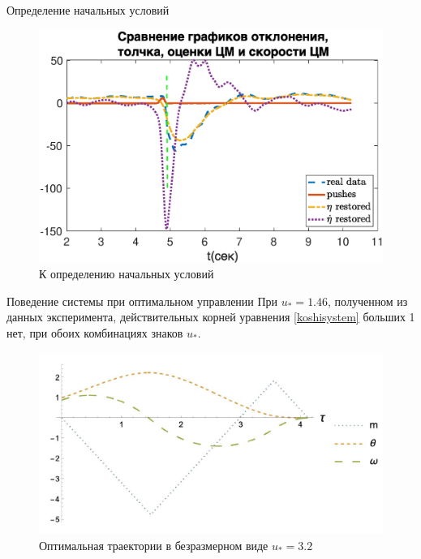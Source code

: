 \documentclass[10pt]{beamer}
\begin{document}
\begin{frame}{Определение начальных условий}
	\begin{figure}[h!]
		\centering
		\includegraphics[width=1\linewidth]{images/cp3_bold.eps}
		\caption{К определению начальных условий}
		\label{restore_double_real}
	\end{figure}
\end{frame}

\begin{frame}{Поведение системы при оптимальном управлении}
	При $u_\ast=1.46$, полученном из данных эксперимента, действительных корней уравнения \eqref{koshisystem} больших 1 нет,
	при обоих комбинациях знаков $u_\ast$.
	\begin{figure}[h!]
		\centering
		\includegraphics[width=0.7\linewidth]{3_graphs.jpeg}
		\caption{Оптимальная траектории в безразмерном виде $u_\ast=3.2$ }
		\label{3_graphs}
	\end{figure}
\end{frame}
\end{document}
